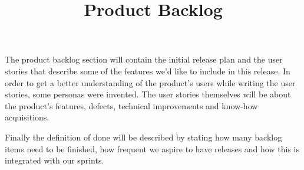 \documentclass{article}
\begin{document}
\title{Product Backlog}
\date{}
\maketitle

The product backlog section will contain the initial release plan and the user stories that describe some of the features we'd like to include in this release. In order to get a better understanding of the product's users while writing the user stories, some personas were invented. The user stories themselves will be about the product's features, defects, technical improvements and know-how acquisitions.

Finally the definition of done will be described by stating how many backlog items need to be finished, how frequent we aspire to have releases and how this is integrated with our sprints.
\end{document}
